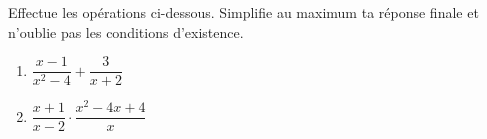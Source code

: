 %
%
    Effectue les opérations ci-dessous. Simplifie au maximum ta réponse finale et n'oublie pas les conditions d'existence.
    \begin{enumerate}[cols=2]
        \item %
              $\dfrac{x-1}{x^2-4} + \dfrac{3}{x+2}$
        \item %
              $\dfrac{x+1}{x-2}\cdot\dfrac{x^2-4x+4}{x}$
    \end{enumerate}

